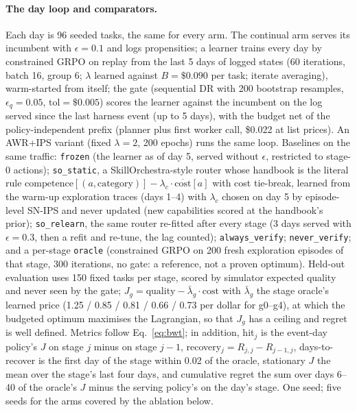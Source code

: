 \documentclass[10pt]{article}
\newcommand{\code}[1]{\texttt{#1}}
\begin{document}
\paragraph{The day loop and comparators.} Each day is 96 seeded tasks, the same for every arm. The continual arm serves its incumbent with $\epsilon=0.1$ and logs propensities; a learner trains every day by constrained GRPO on replay from the last 5 days of logged states (60 iterations, batch 16, group 6; $\lambda$ learned against $B=\$0.090$ per task; iterate averaging), warm-started from itself; the gate (sequential DR with 200 bootstrap resamples, $\epsilon_q=0.05$, $\mathrm{tol}=\$0.005$) scores the learner against the incumbent on the log served since the last harness event (up to 5 days), with the budget net of the policy-independent prefix (planner plus first worker call, \$0.022 at list prices). An AWR+IPS variant (fixed $\lambda=2$, 200 epochs) runs the same loop. Baselines on the same traffic: \code{frozen} (the learner as of day 5, served without $\epsilon$, restricted to stage-0 actions); \code{so\_static}, a SkillOrchestra-style router whose handbook is the literal rule $\mathrm{competence}[(a,\text{category})]-\lambda_c\cdot\overline{\mathrm{cost}}[a]$ with cost tie-break, learned from the warm-up exploration traces (days 1--4) with $\lambda_c$ chosen on day 5 by episode-level SN-IPS and never updated (new capabilities scored at the handbook's prior); \code{so\_relearn}, the same router re-fitted after every stage (3 days served with $\epsilon=0.3$, then a refit and re-tune, the lag counted); \code{always\_verify}; \code{never\_verify}; and a per-stage \code{oracle} (constrained GRPO on 200 fresh exploration episodes of that stage, 300 iterations, no gate: a reference, not a proven optimum). Held-out evaluation uses 150 fixed tasks per stage, scored by simulator expected quality and never seen by the gate; $J_g=\text{quality}-\bar\lambda_g\cdot\text{cost}$ with $\bar\lambda_g$ the stage oracle's learned price (1.25 / 0.85 / 0.81 / 0.66 / 0.73 per dollar for g0--g4), at which the budgeted optimum maximises the Lagrangian, so that $J_g$ has a ceiling and regret is well defined. Metrics follow Eq.~\eqref{eq:bwt}; in addition, hit$_j$ is the event-day policy's $J$ on stage $j$ minus on stage $j-1$, recovery$_j=R_{j,j}-R_{j-1,j}$, days-to-recover is the first day of the stage within 0.02 of the oracle, stationary $J$ the mean over the stage's last four days, and cumulative regret the sum over days 6--40 of the oracle's $J$ minus the serving policy's on the day's stage. One seed; five seeds for the arms covered by the ablation below.
\end{document}

